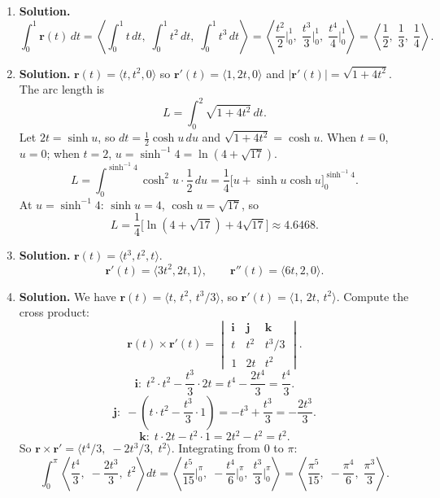\begin{enumerate}
\item \textbf{Solution.}
\[
\int_0^1 \mathbf{r}(t)\,dt = \left\langle \int_0^1 t\,dt,\; \int_0^1 t^2\,dt,\; \int_0^1 t^3\,dt\right\rangle = \left\langle \frac{t^2}{2}\bigg|_0^1,\; \frac{t^3}{3}\bigg|_0^1,\; \frac{t^4}{4}\bigg|_0^1\right\rangle = \boxed{\left\langle \frac{1}{2},\; \frac{1}{3},\; \frac{1}{4}\right\rangle.}
\]

\item \textbf{Solution.}
$\mathbf{r}(t)=\langle t, t^2, 0\rangle$ so $\mathbf{r}'(t)=\langle 1, 2t, 0\rangle$ and $|\mathbf{r}'(t)|=\sqrt{1+4t^2}$.
The arc length is
\[
L=\int_0^2 \sqrt{1+4t^2}\,dt.
\]
Let $2t=\sinh u$, so $dt=\frac{1}{2}\cosh u\,du$ and $\sqrt{1+4t^2}=\cosh u$.
When $t=0$, $u=0$; when $t=2$, $u=\sinh^{-1}4=\ln(4+\sqrt{17})$.
\[
L=\int_0^{\sinh^{-1}4}\cosh^2 u\cdot\frac{1}{2}\,du = \frac{1}{4}\bigl[u+\sinh u\cosh u\bigr]_0^{\sinh^{-1}4}.
\]
At $u=\sinh^{-1}4$: $\sinh u=4$, $\cosh u=\sqrt{17}$, so
\[
\boxed{L = \frac{1}{4}\bigl[\ln(4+\sqrt{17})+4\sqrt{17}\bigr] \approx 4.6468.}
\]


\item \textbf{Solution.}
$\mathbf{r}(t)=\langle t^3, t^2, t\rangle$.
\[
\mathbf{r}'(t)=\langle 3t^2, 2t, 1\rangle, \qquad \boxed{\mathbf{r}''(t)=\langle 6t, 2, 0\rangle.}
\]

\item \textbf{Solution.}
We have $\mathbf{r}(t)=\langle t,\, t^2,\, t^3/3\rangle$, so $\mathbf{r}'(t)=\langle 1,\, 2t,\, t^2\rangle$.
Compute the cross product:
\[
\mathbf{r}(t)\times\mathbf{r}'(t) = \begin{vmatrix}\mathbf{i}&\mathbf{j}&\mathbf{k}\\ t & t^2 & t^3/3 \\ 1 & 2t & t^2\end{vmatrix}.
\]
\[
\mathbf{i}:\; t^2\cdot t^2 - \frac{t^3}{3}\cdot 2t = t^4-\frac{2t^4}{3}=\frac{t^4}{3}.
\]
\[
\mathbf{j}:\; -\!\left(t\cdot t^2 - \frac{t^3}{3}\cdot 1\right)=-t^3+\frac{t^3}{3}=-\frac{2t^3}{3}.
\]
\[
\mathbf{k}:\; t\cdot 2t - t^2\cdot 1 = 2t^2-t^2=t^2.
\]
So $\mathbf{r}\times\mathbf{r}'=\langle t^4/3,\; -2t^3/3,\; t^2\rangle$.
Integrating from $0$ to $\pi$:
\[
\int_0^{\pi}\left\langle \frac{t^4}{3},\;-\frac{2t^3}{3},\; t^2\right\rangle dt = \left\langle \frac{t^5}{15}\bigg|_0^\pi,\; -\frac{t^4}{6}\bigg|_0^\pi,\; \frac{t^3}{3}\bigg|_0^\pi\right\rangle = \boxed{\left\langle \frac{\pi^5}{15},\; -\frac{\pi^4}{6},\; \frac{\pi^3}{3}\right\rangle.}
\]


\end{enumerate}
